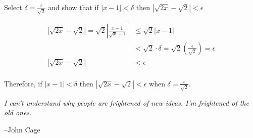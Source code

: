 \documentclass{exam}
\begin{document}
\begin{description}
Select $\delta = \frac{\epsilon}{\sqrt{2}}$ and show that if $|x - 1| < \delta$ then $\left|\sqrt{2x} - \sqrt{2} \right| < \epsilon$

\vspace{0.2 cm}

\begin{align*}
  | \sqrt{2x} - \sqrt{2}| = \sqrt{2} \left| \frac{x - 1}{\sqrt{x} + 1} \right| &\leq  \sqrt{2} | x - 1| \\
      &< \sqrt{2} \cdot \delta = \sqrt{2} \left( \frac{\epsilon}{\sqrt{2}} \right) = \epsilon \\ 
  | \sqrt{2x} - \sqrt{2}| &< \epsilon \\ 
\end{align*}

Therefore, if $|x - 1| < \delta$ then $| \sqrt{2x} - \sqrt{2}| < \epsilon$ when $\delta = \frac{\epsilon}{\sqrt{2}}$.

\end{description}
\else

\vspace{10 cm}

{\em I can't understand why people are frightened of new ideas. I'm frightened of the old ones.}

\vspace{.2 cm}

\hspace{1 cm} --John Cage

\fi
\end{document}
